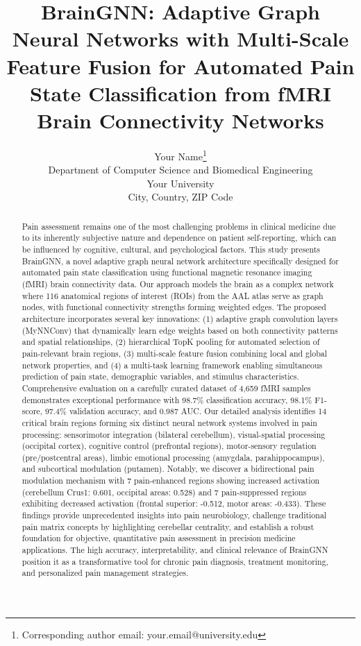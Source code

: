 \documentclass[10pt,journal,compsoc]{IEEEtran}
\title{BrainGNN: Adaptive Graph Neural Networks with Multi-Scale Feature Fusion for Automated Pain State Classification from fMRI Brain Connectivity Networks}
\author{
    Your Name\thanks{Corresponding author email: your.email@university.edu}\\
    Department of Computer Science and Biomedical Engineering\\
    Your University\\
    City, Country, ZIP Code
}
\begin{document}
\maketitle

\begin{abstract}
Pain assessment remains one of the most challenging problems in clinical medicine due to its inherently subjective nature and dependence on patient self-reporting, which can be influenced by cognitive, cultural, and psychological factors. This study presents BrainGNN, a novel adaptive graph neural network architecture specifically designed for automated pain state classification using functional magnetic resonance imaging (fMRI) brain connectivity data. Our approach models the brain as a complex network where 116 anatomical regions of interest (ROIs) from the AAL atlas serve as graph nodes, with functional connectivity strengths forming weighted edges. The proposed architecture incorporates several key innovations: (1) adaptive graph convolution layers (MyNNConv) that dynamically learn edge weights based on both connectivity patterns and spatial relationships, (2) hierarchical TopK pooling for automated selection of pain-relevant brain regions, (3) multi-scale feature fusion combining local and global network properties, and (4) a multi-task learning framework enabling simultaneous prediction of pain state, demographic variables, and stimulus characteristics. Comprehensive evaluation on a carefully curated dataset of 4,659 fMRI samples demonstrates exceptional performance with 98.7\% classification accuracy, 98.1\% F1-score, 97.4\% validation accuracy, and 0.987 AUC. Our detailed analysis identifies 14 critical brain regions forming six distinct neural network systems involved in pain processing: sensorimotor integration (bilateral cerebellum), visual-spatial processing (occipital cortex), cognitive control (prefrontal regions), motor-sensory regulation (pre/postcentral areas), limbic emotional processing (amygdala, parahippocampus), and subcortical modulation (putamen). Notably, we discover a bidirectional pain modulation mechanism with 7 pain-enhanced regions showing increased activation (cerebellum Crus1: 0.601, occipital areas: 0.528) and 7 pain-suppressed regions exhibiting decreased activation (frontal superior: -0.512, motor areas: -0.433). These findings provide unprecedented insights into pain neurobiology, challenge traditional pain matrix concepts by highlighting cerebellar centrality, and establish a robust foundation for objective, quantitative pain assessment in precision medicine applications. The high accuracy, interpretability, and clinical relevance of BrainGNN position it as a transformative tool for chronic pain diagnosis, treatment monitoring, and personalized pain management strategies.
\end{abstract}
\end{document}
